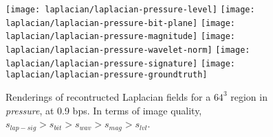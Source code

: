 \begin{figure}[t]
	\centering
	{\texttt{[image: laplacian/laplacian-pressure-level]}}
	{\texttt{[image: laplacian/laplacian-pressure-bit-plane]}}
	{\texttt{[image: laplacian/laplacian-pressure-magnitude]}}
	{\texttt{[image: laplacian/laplacian-pressure-wavelet-norm]}}
	{\texttt{[image: laplacian/laplacian-pressure-signature]}}
	{\texttt{[image: laplacian/laplacian-pressure-groundtruth]}}
	\caption{Renderings of recontructed Laplacian fields for a $64^3$ region in \emph{pressure}, at 0.9 bps.
	In terms of image quality, $s_{lap-sig} > s_{bit} > s_{wav} > s_{mag} > s_{lvl}$.}
	\label{fig:laplacian-renderings}
\end{figure}
